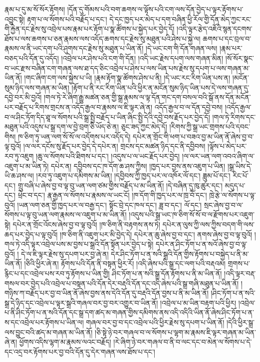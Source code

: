 རྣམ་པ་དུ་མ་སོ་སོར་རྟོགས། །དོན་དུ་གོམས་པའི་བག་ཆགས་ལ་ལྟོས་པའི་ངག་ལས་དོན་བྱེད་པ་ལྟར་རྟོགས་པ་འབྱུང་སྟེ། རྟག་པ་ལ་སོགས་པའི་བརྗོད་པ་དང་། དེ་དང་ཁྱད་པར་མེད་པ་དག་བཞིན་ཕྱི་རོལ་གྱི་དོན་མེད་ཀྱང་རང་གི་རྐྱེན་དང་རྗེས་སུ་འབྲེལ་པས་རྣམ་པར་རྟོག་པ་སྣ་ཚོགས་པ་སྐྱེད་པར་བྱེད་དོ། །འདི་ལྟར་རྩེད་འཇོའི་སྙན་དངགས་ཐོས་པ་ལས་ཆགས་པ་ཅན་རྣམས་ལས་འདོད་ཆགས་དང་རྗེས་སུ་མཐུན་པའི་ཤེས་པ་སྐྱེ་ལ། ཆགས་པ་དང་བྲལ་བ་རྣམས་ལ་ནི་ཡང་དག་པའི་ཤུགས་དང་རྗེས་སུ་མཐུན་པ་ཡིན་ནོ། །དེ་ཡང་ངག་གི་དོན་གཞན་ལས། །རྣམ་པར་བཅད་པའི་དོན་དུ་འདོད། །འབྲེལ་པར་ཤེས་པའི་ངག་གི་དོན། །འདི་ཡང་རྗེས་དཔག་ལས་གཞན་མིན། །སོ་སོར་སྣང་བ་ཡང་རྫས་བཞིན་ངག་གཞན་ལས་ཐ་དད་ཅིང་འབྲེལ་པ་ཤེས་པ་ལས་ཡིན་པས་རྗེས་སུ་དཔག་པ་ལས་གཞན་མ་ཡིན་ནོ། །གང་ཞིག་ངག་ལས་སྐྱེས་པ་ཡི། །རྣམ་རྟོག་སྣ་ཚོགས་ཤེས་པ་ནི། །དེ་ཡང་རང་རིག་ཡིན་པས་ན། །མངོན་སུམ་ཉིད་ལས་གཞན་མ་ཡིན། །རྟོག་པ་ནི་རང་རིག་ཡིན་པའི་ཕྱིར་ན་མངོན་སུམ་ཉིད་ཡིན་པས་དེ་ལས་གཞན་དུ་དབྱེ་བར་མི་བྱའོ། །གལ་ཏེ་རེ་ཞིག་རྒྱུ་མཚན་ཅན་གྱི་སྒྲ་རྣམས་ལ་ལྟ་དོན་གང་དག་བསལ་བའི་སྒོ་ནས་དོན་མངོན་པར་བརྗོད་པ་རིགས་གྲངས་ན་འདོད་རྒྱལ་བ་རྣམས་ལ་ཇི་ལྟར་ཞེ་ན། འདོད་རྒྱལ་བ་ལ་དོན་དབྱེ་བས། །འདོད་རྒྱལ་བ་ལ་ཤིང་ཏོག་དིད་ཐཱ་ལ་སོགས་པའི་སྒྲ་སྤྱི་བརྗོད་པ་ཡིན་ཞིང་སྤྱི་དེའི་དབྱེ་བས་རྗོད་པར་བྱེད་དོ། །གལ་ཏེ་རིགས་དང་མཐུན་པའི་འདུས་པ་སྒྲ་དག་ལ་བྱེ་བྲག་ཅི་ཡོད་ཅེ་ན། ཅུང་ཟད་ཀྱང་མེད་དོ། །རིགས་ཀྱི་སྒྲ་ཡང་གྲགས་པའི་དབང་གིས། ཁ་ཅིག་ཏུ་ཡན་ལག་སོ་སོ་ལ་འདོགས་པར་འདོད་དེ། དཔེར་ན་གྲོང་གི་ཕག་པ་བཟའ་བྱ་མ་ཡིན་ནོ་ཞེས་བྱ་བ་ལྟ་བུའོ། །ལ་ལར་དངོས་སུ་རྗོད་པར་བྱེད་དེ་དཔེར་ན། གྲངས་དང་མཚན་ཉིད་དང་ནི་དབྱིབས། །ལྟོས་པ་མེད་པར་རབ་ཏུ་འཇུག །ཆུ་ལ་སོགས་པའི་ཐིགས་པ་དང་། །འདུས་པ་ལ་ཡང་རྗོད་པར་བྱེད། །ལ་ལར་ཡན་ལག་འབའ་ཞིག་ལ་འཇུག་པ་མ་ཡིན་ཏེ། དཔེར་ན། དབྱིབས་དང་ཁ་དོག་ཆ་ཤས་ཀྱིས། །ཁྱད་པར་བྱས་ནས་འཇུག་པ་ཡིན། །སྒྲ་ཡིས་དེ་ཡི་ཆ་ཤས་ལ། །རབ་ཏུ་འཇུག་པ་དམིགས་མ་ཡིན། །དབྱིབས་ཀྱི་ཁྱད་པར་ལ་འཁོར་ལོ་དང་། ཟླུམ་པོ་དང་། རིང་པོ་དང་། གྲུ་བཞི་པ་ཞེས་བྱ་བ་ལྟ་བུ་ཡན་ལག་ཙམ་གྱིས་བརྗོད་པ་མ་ཡིན་ནོ། །དེ་བཞིན་དུ་ཁུ་ཚུར་དང་། མདུད་པ་དང་། ཕྲེང་བ་དང་། རྣ་རྒྱན་ལ་སོགས་པ་རྣམས་ལ་ཡང་ངོ། །ཁ་དོག་གི་ཁྱད་པར་ལ་ཁྲ་བོ་དང་། ཁྲེ་རྩེ་ལ་སོགས་པ་ལྟ་བུའོ། །ཡན་ལག་ཅན་གྱི་ཁྱད་པར་ལ་བརྒྱ་དང་། སྟོང་བྲེ་དང་ཁལ་དང་། ཟླ་བ་དང་། ལོ་དང་། སྲང་ཞེས་བྱ་བ་ལ་སོགས་པ་ལྟ་བུ་ཡན་ལག་རྣམས་ལ་འཇུག་པ་མ་ཡིན་ནོ། །འདུས་པའི་སྒྲ་ཡང་ཁ་ཅིག་སོ་སོ་བ་ལ་རྫོགས་པར་འཇུག་སྟེ། དཔེར་ན་གྲོང་འོངས་ཞེས་བྱ་བ་ལྟ་བུའོ། །ཁ་ཅིག་ནི་བརྟགས་ནས་ཏེ། དཔེར་ན་ལུས་ཀྱི་ལས་ཀྱིས་བདག་གི་ལས་ཆད་པར་བྱེད་པ་ལྟ་བུའོ། །ཁ་ཅིག་ནི་འཇུག་པར་མི་བྱེད་དེ། དཔེར་ན་ཆུ་ཞེས་བྱ་བ་དང་། ནགས་ཞེས་བྱ་བ་ལྟ་བུའོ། །གལ་ཏེ་འདི་ལྟར་འབྲེལ་པས་མ་བྱས་པ་སྒྲའི་དོན་སྟོན་པར་བྱེད་པ་སྟེ། དཔེར་ན་ཤིང་ཏོག་པ་ན་སའོ་ཞེས་བྱ་བ་ལྟ་བུའོ། ། དེ་ལ་ཇི་ལྟར་རྗེས་སུ་དཔག་པར་བྱ་ཞེ་ན། དེར་ཤིང་ཏོག་པ་ན་སའི་སྒྲའི་དོན་གྱིས་རྟོགས་པ་བསྐྱེད་པ་ནི་མ་ཡིན་ནོ། །ཅིའི་ཕྱིར་ཞེ་ན། རྟོགས་པའི་དོན་ནི་བསྟན་ཕྱིར་རོ། །འདི་ཞེས་པའི་སྒྲ་དང་ལག་པའི་བརྡའམ། གྲགས་པ་རྙིང་པ་དང་འབྲེལ་པས་རབ་ཏུ་རྟོགས་པ་ཡིན་གྱི། ཤིང་ཏོག་པ་ན་སའི་སྒྲ་དོན་རྟོགས་པ་ནི་མ་ཡིན་ནོ། །འདི་ལྟར་བརྡ་གསལ་བར་བྱེད་པའི་འབྲེལ་པ་བསྟན་པའི་དོན་དེར་བརྡའི་དོན་དང་འདི་ཞེས་པའི་སྒྲ་གཞི་མཐུན་པ་ཡིན་ནོ། །གཉིས་ཀ་བརྗོད་པར་བྱ་བ་ཡིན་ནོ་ཞེས་བྱས་ནས་དེའི་དོན་དུ་བརྡའི་དོན་བྱས་པ་ནི་མ་ཡིན་ནོ། །ཤིང་ཏོག་པ་ན་སའི་སྒྲ་དེ་ཉིད་དང་འབྲེལ་པ་ལྟར་སྒྲའི་གཞལ་བར་བྱ་བར་འགྱུར་བ་ཡིན་ནོ། །འབྲེལ་པ་མ་ཡིན་བརྟག་པའི་ཕྱིར། །འབྲེལ་པ་ནི་ཤིང་ཏོག་པ་ན་སའི་དོན་དང་སྒྲ་དག་ཚད་མ་གཞན་གྱིས་དམིགས་ནས་འདི་འདིའི་ཡིན་ནོ་ཞེས་ཤིང་ཏོག་པ་ན་ས་དང་འབྲེལ་པར་རྟོགས་པ་ཡིན་ལ། གཞལ་བར་བྱ་བ་དང་འབྲེལ་པའི་ཕྱིར་རྗེས་སུ་དཔག་པ་ཡིན་ནོ། །དེའི་ཕྱིར་སྒྲ་ལས་བྱུང་བའི་ཚད་མ་གཞན་མ་ཡིན་ནོ། །ཅི་སྟེ་ཉེ་བར་གཞལ་བ་ལ་སོགས་པ་ལྷག་མ་རྣམས་ཇི་ལྟར་གཞན་མ་ཡིན་ཞེ་ན། ཕྱོགས་འདིས་ལྷག་མ་རྣམས་ལའང་བརྗོད། །རེ་ཞིག་ཉེ་བར་གཞལ་བ་ནི་བ་ལང་དང་བ་མེན་ལ་སོགས་པ་དེ་དང་འདྲ་བར་རྟོགས་པར་བྱ་བའི་དོན་དུ་དེར་གཞན་ལས་ཐོས་པ་དང་། 
